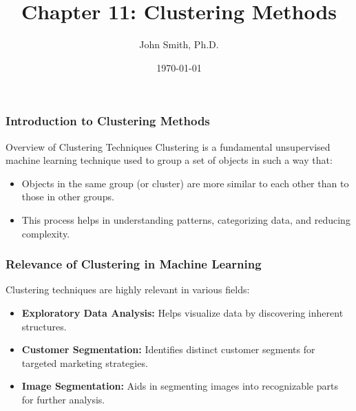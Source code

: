 \documentclass[aspectratio=169]{beamer}
\title[Clustering Methods]{Chapter 11: Clustering Methods}
\author{John Smith, Ph.D.}
\institute[University Name]{
  Department of Computer Science\\
  University Name\\
  \vspace{0.3cm}
  Email: email@university.edu\\
}
\date{\today}
\begin{document}
\frame{\titlepage}

\begin{frame}[fragile]
    \frametitle{Introduction to Clustering Methods}
    \begin{block}{Overview of Clustering Techniques}
        Clustering is a fundamental unsupervised machine learning technique used to group a set of objects in such a way that:
        \begin{itemize}
            \item Objects in the same group (or cluster) are more similar to each other than to those in other groups.
            \item This process helps in understanding patterns, categorizing data, and reducing complexity.
        \end{itemize}        
    \end{block}
\end{frame}

\begin{frame}[fragile]
    \frametitle{Relevance of Clustering in Machine Learning}
    Clustering techniques are highly relevant in various fields:
    \begin{itemize}
        \item \textbf{Exploratory Data Analysis:} Helps visualize data by discovering inherent structures.
        \item \textbf{Customer Segmentation:} Identifies distinct customer segments for targeted marketing strategies.
        \item \textbf{Image Segmentation:} Aids in segmenting images into recognizable parts for further analysis.
    \end{itemize}
\end{frame}
\end{document}
